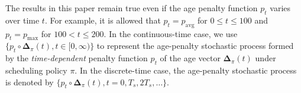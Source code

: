 The results in this paper remain true even if the age penalty function $p_t$ varies over time $t$. For example, it is allowed  that $p_t = p_{\text{avg}}$ for $0\leq t \leq 100$ and $p_t = p_{\text{max}}$ for $100<t \leq 200$. 
In the continuous-time case, we use $\{p_t \circ \bm{\Delta}_\pi(t), t\in [0,\infty)\}$ to represent the age-penalty stochastic process formed by the \emph{time-dependent} penalty function $p_t$ of the age vector $\bm{\Delta}_{\pi}(t)$ under scheduling policy $\pi$. In the discrete-time case, the age-penalty stochastic process is denoted by $\{p_t \circ \bm{\Delta}_\pi(t), t=0,T_s,2 T_s,\ldots\}$. 




%


%



